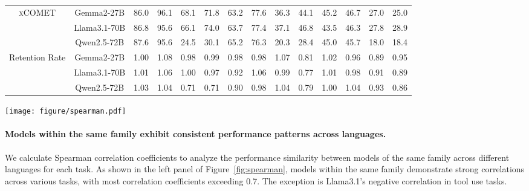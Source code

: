 \begin{table*}[ht]
\begin{tabular}{c|c|cccc|cccc|cccc}
        \multirow{3}{*}{\textsc{xCOMET}} & Gemma2-27B & 86.0 & 96.1 & 68.1 & 71.8 & 63.2 & 77.6 & 36.3 & 44.1 & 45.2 & 46.7 & 27.0 & 25.0 \\
        & Llama3.1-70B & 86.8 & 95.6 & 66.1 & 74.0 & 63.7 & 77.4 & 37.1 & 46.8 & 43.5 & 46.3 & 27.8 & 28.9 \\
        & Qwen2.5-72B & 87.6 & 95.6 & 24.5 & 30.1 & 65.2 & 76.3 & 20.3 & 28.4 & 45.0 & 45.7 & 18.0 & 18.4 \\
        \midrule
        \multirow{3}{*}{Retention Rate} & Gemma2-27B & 1.00 & 1.08 & 0.98 & 0.99 & 0.98 & 0.98 & 1.07 & 0.81 & 1.02 & 0.96 & 0.89 & 0.95 \\
        & Llama3.1-70B & 1.01 & 1.06 & 1.00 & 0.97 & 0.92 & 1.06 & 0.99 & 0.77 & 1.01 & 0.98 & 0.91 & 0.89 \\
        & Qwen2.5-72B & 1.03 & 1.04 & 0.71 & 0.71 & 0.90 & 0.98 & 1.04 & 0.79 & 1.00 & 1.04 & 0.93 & 0.86 \\
        \bottomrule
    \end{tabular}
\end{table*}

\begin{figure*}[ht]
    \centering
    \texttt{[image: figure/spearman.pdf]}
    \vskip -0.1in
    \caption{\textbf{Left:} Spearman Correlations between the performance of two models within the same family across different languages. \textbf{Right:} Spearman Correlations between the performance of models on general translation and domain translation.}
    \label{fig:spearman}
\end{figure*}

\paragraph{Models within the same family exhibit consistent performance patterns across languages.}
We calculate Spearman correlation coefficients to analyze the performance similarity between models of the same family across different languages for each task.
As shown in the left panel of Figure~\ref{fig:spearman}, models within the same family demonstrate strong correlations across various tasks, with most correlation coefficients exceeding 0.7.
The exception is Llama3.1's negative correlation in tool use tasks.


